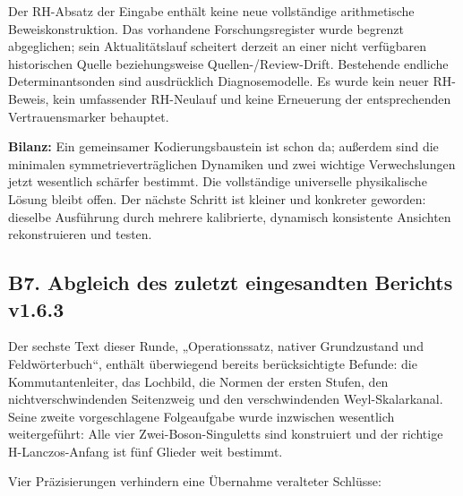 Der RH-Absatz der Eingabe enthält keine neue vollständige arithmetische
Beweiskonstruktion. Das vorhandene Forschungsregister wurde begrenzt
abgeglichen; sein Aktualitätslauf scheitert derzeit an einer nicht
verfügbaren historischen Quelle beziehungsweise Quellen-/Review-Drift.
Bestehende endliche Determinantsonden sind ausdrücklich Diagnosemodelle.
Es wurde kein neuer RH-Beweis, kein umfassender RH-Neulauf und keine
Erneuerung der entsprechenden Vertrauensmarker behauptet.

\textbf{Bilanz:} Ein gemeinsamer Kodierungsbaustein ist schon da;
außerdem sind die minimalen symmetrieverträglichen Dynamiken und zwei
wichtige Verwechslungen jetzt wesentlich schärfer bestimmt. Die
vollständige universelle physikalische Lösung bleibt offen. Der nächste
Schritt ist kleiner und konkreter geworden: dieselbe Ausführung durch
mehrere kalibrierte, dynamisch konsistente Ansichten rekonstruieren und
testen.

\subsection{B7. Abgleich des zuletzt eingesandten Berichts
v1.6.3}\label{b7.-abgleich-des-zuletzt-eingesandten-berichts-v1.6.3}

Der sechste Text dieser Runde, „Operationssatz, nativer Grundzustand und
Feldwörterbuch``, enthält überwiegend bereits berücksichtigte Befunde:
die Kommutantenleiter, das Lochbild, die Normen der ersten Stufen, den
nichtverschwindenden Seitenzweig und den verschwindenden
Weyl-Skalarkanal. Seine zweite vorgeschlagene Folgeaufgabe wurde
inzwischen wesentlich weitergeführt: Alle vier Zwei-Boson-Singuletts
sind konstruiert und der richtige H-Lanczos-Anfang ist fünf Glieder weit
bestimmt.

Vier Präzisierungen verhindern eine Übernahme veralteter Schlüsse:


